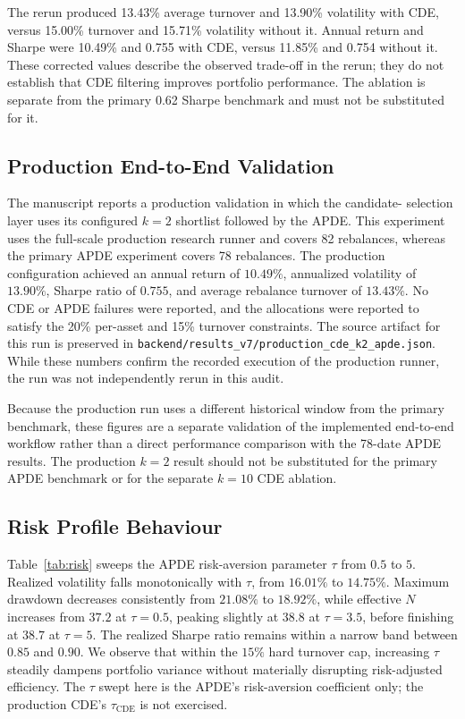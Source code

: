 \documentclass[conference]{IEEEtran}
\begin{document}
The rerun produced 13.43\% average turnover and 13.90\% volatility with
CDE, versus 15.00\% turnover and 15.71\% volatility without it. Annual
return and Sharpe were 10.49\% and 0.755 with CDE, versus 11.85\% and
0.754 without it. These corrected values describe the observed trade-off
in the rerun; they do not establish that CDE filtering improves portfolio
performance. The ablation is separate from the primary 0.62 Sharpe
benchmark and must not be substituted for it.

\subsection{Production End-to-End Validation}
\label{sec:production-validation}
The manuscript reports a production validation in which the candidate-
selection layer uses its configured $k=2$ shortlist followed by
the APDE. This experiment uses the full-scale production research
runner and covers 82 rebalances, whereas the primary APDE experiment
covers 78 rebalances. The production configuration achieved an annual
return of $10.49\%$, annualized volatility of $13.90\%$, Sharpe ratio
of $0.755$, and average rebalance turnover of $13.43\%$. No CDE or APDE
failures were reported, and the allocations were reported to satisfy
the 20\% per-asset and 15\% turnover constraints. The source artifact
for this run is preserved in \texttt{backend/results\_v7/production\_cde\_k2\_apde.json}.
While these numbers confirm the recorded execution of the production runner,
the run was not independently rerun in this audit.

Because the production run uses a different historical window from the
primary benchmark, these figures are a separate validation of the
implemented end-to-end workflow rather than a direct performance
comparison with the 78-date APDE results. The production $k=2$ result
should not be substituted for the primary APDE benchmark or for the
separate $k=10$ CDE ablation.

\subsection{Risk Profile Behaviour}
Table~\ref{tab:risk} sweeps the APDE risk-aversion parameter $\tau$
from $0.5$ to $5$. Realized volatility falls monotonically with $\tau$,
from $16.01\%$ to $14.75\%$. Maximum drawdown decreases consistently
from $21.08\%$ to $18.92\%$, while effective $N$ increases from
$37.2$ at $\tau=0.5$, peaking slightly at $38.8$ at $\tau=3.5$, before
finishing at $38.7$ at $\tau=5$. The realized Sharpe ratio remains
within a narrow band between $0.85$ and $0.90$. We observe that within
the $15\%$ hard turnover cap, increasing $\tau$ steadily dampens portfolio
variance without materially disrupting risk-adjusted efficiency. The $\tau$
swept here is the APDE's risk-aversion coefficient only; the production
CDE's $\tau_{\text{CDE}}$ is not exercised.
\end{document}
